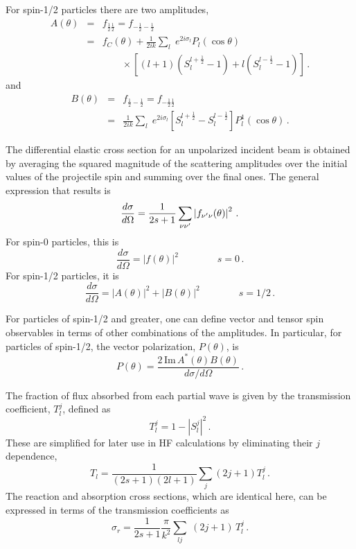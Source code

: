 For spin-1/2 particles there are two amplitudes,
\begin{eqnarray}
A(\theta) & = & f_{\frac{1}{2}\frac{1}{2}}=f_{-\frac{1}{2}-\frac{1}{2}} \\
& = & f_{C}(\theta)+\frac{1}{2ik}\sum_{l}\; e^{2i\sigma_{l}}P_{l}(\cos\theta)
\nonumber \\
& & \qquad\times\left[(l+1)(S_{l}^{l+\frac{1}{2}}-1)+l(S_{l}^{l-\frac{1}{2}%
}-1)\right]\,.  \nonumber
\end{eqnarray}
and
\begin{eqnarray}
B(\theta) & = & f_{\frac{1}{2}-\frac{1}{2}}=f_{-\frac{1}{2}\frac{1}{2}} \\
& = & \frac{1}{2ik}\sum_{l}\; e^{2i\sigma_{l}}\left[S_{l}^{l+\frac{1}{2}%
}-S_{l}^{l-\frac{1}{2}}\right]P_{l}^{1}(\cos\theta)\,.  \nonumber
\end{eqnarray}

The differential elastic cross section for an unpolarized incident beam is
obtained by averaging the squared magnitude of the scattering amplitudes
over the initial values of the projectile spin and summing over the final
ones. The general expression that results is
\begin{equation}
\frac{d\sigma}{d\Omega}=\frac{1}{2s+1}\sum_{\nu\nu^{\prime}}\left|f_{\nu^{%
\prime}\nu}(\theta)\right|^{2}\,.  \label{difel}
\end{equation}
For spin-0 particles, this is
\begin{equation}
\frac{d\sigma}{d\Omega}=\left|f(\theta)\right|^{2}\qquad\qquad s=0\,.
\end{equation}
For spin-1/2 particles, it is
\begin{equation}
\frac{d\sigma}{d\Omega}=\left|A(\theta)\right|^{2}+\left|B(\theta)%
\right|^{2}\qquad\qquad s=1/2\,.
\end{equation}

For particles of spin-1/2 and greater, one can define vector and tensor spin
observables in terms of other combinations of the amplitudes. In particular,
for particles of spin-1/2, the vector polarization, $P(\theta)$, is
\begin{equation}
P(\theta)=\frac{2\,\text{Im}\, A^{*}(\theta)B(\theta)}{d\sigma/d\Omega}\,.
\end{equation}

The fraction of flux absorbed from each partial wave is given by the
transmission coefficient, $T_{l}^{j}$, defined as
\begin{equation}
T_{l}^{j}=1-\left|S_{l}^{j}\right|^{2}\,.
\end{equation}
These are simplified for later use in HF calculations by eliminating their $j
$ dependence,
\begin{equation}
T_{l}=\frac{1}{(2s+1)(2l+1)}\sum_j (2j+1) T_{l}^{j}\,.
\end{equation}
The reaction and absorption cross sections, which are identical here, can be
expressed in terms of the transmission coefficients as
\begin{equation}
\sigma_{r}=\frac{1}{2s+1}\frac{\pi}{k^{2}}\sum_{lj}\;(2j+1)\, T_{l}^{j}\,.
\end{equation}

